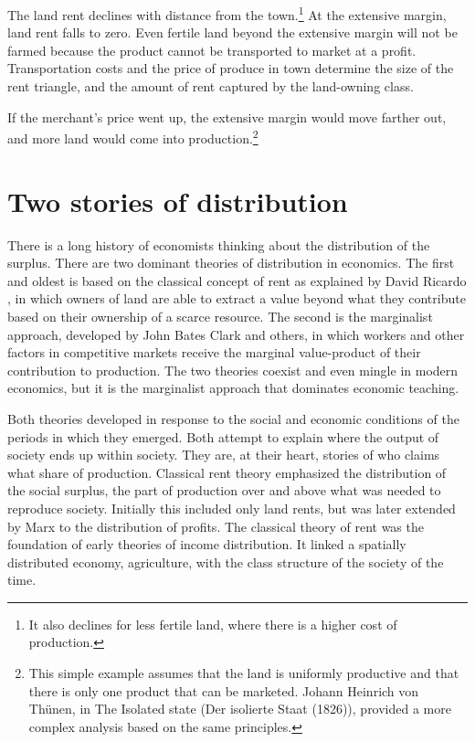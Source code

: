 The land rent %
declines with distance from the town.\footnote{It also declines for less fertile land, where there is a higher cost of production.} 
At the extensive margin, land rent falls to zero. Even fertile land beyond the extensive margin will not be farmed because the product cannot be transported to market at a profit. Transportation costs and the price of produce in town determine the size of the  rent triangle, and the amount of rent captured by the land-owning class.%

If the merchant's price went up, the \gls{extensive margin} would move farther out, and more land would come into production.\footnote{This simple example assumes that the land is uniformly productive and that there is only one product that can be marketed. Johann Heinrich von Th\"unen, in The Isolated state (Der isolierte Staat (1826)\cite{vonthunenIsolirteStaatBeziehung1826}), provided a more complex analysis based on the same principles.}


\section{Two stories of distribution}
There is a long history of economists thinking about the distribution of the surplus. %
There are two dominant theories of \gls{distribution} in economics. The first and oldest is based on the classical concept of rent as explained  by David Ricardo \cite{ricardoEssayInfluenceLow1815}, in which owners of land are able to extract a value beyond what they contribute based on their ownership of a scarce resource. The second is the marginalist approach, developed by John Bates Clark and others, in which workers and other factors  in competitive markets receive the \gls{marginal value-product} of their contribution to production. The two theories coexist and even mingle in modern economics, but it is the marginalist approach that dominates economic teaching. 

Both theories developed in response to the social and economic conditions of the periods in which they emerged. Both attempt to explain where the output of society ends up within society. They are, at their heart, stories of who %
claims what share of production. Classical rent theory emphasized the distribution of the social \gls{surplus}, the part of production over and above what was needed to reproduce society. Initially this included only land rents, but was later extended by Marx to the distribution of profits.
The classical theory of rent was the foundation of early %
theories of income distribution. It linked a spatially distributed economy, agriculture, with the class structure of the society of the time. 

